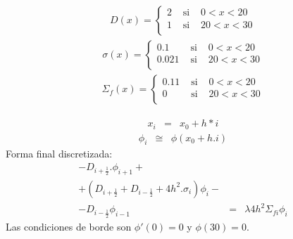 \documentclass[11pt,a4paper]{emulateapj}
\begin{document}
\begin{eqnarray}
	D(x)=\left\{
		\begin{matrix}
			2 &\mbox{ si }& 0 < x < 20\\
			1 & \mbox{ si }& 20 < x < 30\\
		\end{matrix} \right.
\end{eqnarray}
\begin{eqnarray}
	\sigma(x)=\left\{
		\begin{matrix}
			0.1 &\mbox{ si }& 0 < x < 20\\
			0.021 & \mbox{ si }& 20 < x < 30\\
		\end{matrix} \right.
\end{eqnarray}
\begin{eqnarray}
	\Sigma_f(x)=\left\{
		\begin{matrix}
			0.11 &\mbox{ si }& 0 < x < 20\\
			0 & \mbox{ si }& 20 < x < 30\\
		\end{matrix} \right.
\end{eqnarray}

\begin{eqnarray}
	x_i &=&x_0 + h*i
\end{eqnarray}
\begin{eqnarray}
	\phi_i &\cong&\phi(x_0 + h.i)
\end{eqnarray}
Forma final discretizada:
\begin{eqnarray}
	-D_{i+\frac{1}{2}}.\phi_{i+1} + \\
	+(D_{i+\frac{1}{2}} + D_{i-\frac{1}{2}} + 4h^2.\sigma_i)\phi_{i} - \\
	-D_{i-\frac{1}{2}}\phi_{i-1} &=& \lambda 4h^2 \Sigma_{fi} \phi_i
\end{eqnarray}
Las condiciones de borde son $\phi'(0) = 0$ y $\phi(30) = 0$.
\end{document}
